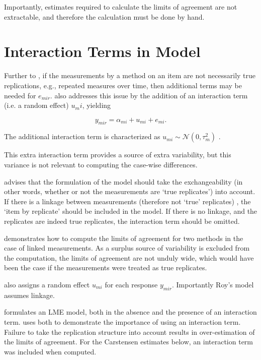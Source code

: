\documentclass[12pt, a4paper]{report}
\theoremstyle{plain}
\theoremstyle{definition}
\theoremstyle{remark}
\begin{document}
Importantly, estimates required to calculate the limits of agreement are not extractable, and therefore the calculation must be done by hand.



\section{Interaction Terms in Model}

Further to \citet{barnhart}, if the measurements by a method on an item are not necessarily true replications, e.g., repeated measures over time, then additional terms may be needed for $e_{mir}$. \citet{bxc2008} also addresses this issue by the addition of an interaction term (i.e. a random effect) $u_mi$, yielding

\[ y_{mir} =  \alpha_{mi} + u_{mi} + e_{mi}.  \]

The additional interaction term is characterized as $u_{mi}  \sim \mathcal{N}(0, \tau^2_m)$ \citep{bxc2008}.

This extra interaction term provides a source of extra variability, but this variance is not relevant to computing the case-wise differences.

\citet{bxc2008} advises that the formulation of the model should take the exchangeability (in other words, whether or not the measurements are `true replicates') into account. If there is a linkage between measurements (therefore not `true' replicates) , the `item by replicate' should be included in the model. If there is no linkage, and the replicates are indeed true replicates, the interaction term should be omitted.

\citet{bxc2008} demonstrates how to compute the limits of agreement for two methods in the case of linked measurements. As a surplus source of variability is excluded from the computation, the limits of agreement are not unduly wide, which would have been the case if the measurements were treated as true replicates.

\citet{Roy} also assigns a random effect $u_{mi}$ for each response $y_{mir}$. Importantly Roy's model assumes linkage.


\citet{BXC2008} formulates an LME model, both in the absence and the presence of an interaction term.\citet{bxc} uses both to demonstrate the importance of using an interaction term. Failure to take the replication structure into
account results in over-estimation of the limits of agreement. For the Carstensen estimates below, an interaction term was included when computed.
\end{document}
